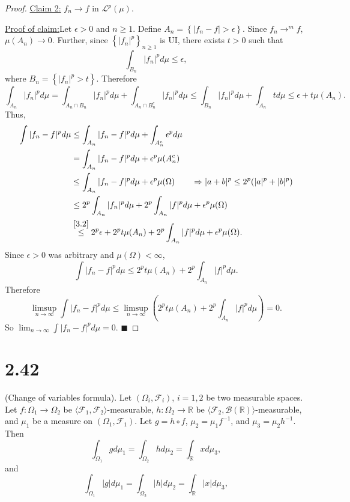 \documentclass[12pt]{article}
\newenvironment{claimproof}[1]{\par\noindent\underline{Proof of claim:}\space#1}{\hfill $\blacksquare$\vspace{3mm}}
\begin{document}
\begin{proof}
\underline{Claim 2:} $f_{n} \rightarrow f$ in $\mathcal{L}^{p}(\mu)$.
\begin{claimproof}
Let $\epsilon > 0$ and $n\geq 1$. Define $A_{n} = \left\{ |f_{n} - f| > \epsilon \right\}$. Since $f_{n} \rightarrow^{m} f$, $\mu(A_{n}) \rightarrow 0$. Further,
since $\left\{ |f_{n}|^{p} \right\}_{n\geq 1}$ is UI, there exists $t > 0$ such that 
\[ \int_{B_{n}}|f_{n}|^{p}d\mu \leq \epsilon, \]
where $B_{n} = \left\{ |f_{n}|^{p} > t \right\}$. Therefore 
\begin{equation}
\int_{A_{n}} |f_{n}|^{p}d\mu = \int_{A_{n}\cap B_{n}}|f_{n}|^{p}d\mu + \int_{A_{n}\cap B_{n}^{c}}|f_{n}|^{p}d\mu \leq \int_{B_{n}}|f_{n}|^{p}d\mu 
+ \int_{A_{n}}td\mu \leq \epsilon + t\mu(A_{n}).
\label{3.2}
\end{equation}
Thus,
\begin{align*}
\int |f_{n} - f|^{p} d\mu & \leq \int_{A_{n}}|f_{n} - f|^{p}d\mu + \int_{A_{n}^{c}}\epsilon^{p} d\mu \\
& = \int_{A_{n}}|f_{n}- f|^{p}d\mu + \epsilon^{p}\mu(A_{n}^{c}) \\
& \leq \int_{A_{n}}|f_{n} - f|^{p}d\mu + \epsilon^{p}\mu(\Omega) \qquad \Rightarrow |a+b|^{p} \leq 2^{p}(|a|^{p} + |b|^{p}) \\
& \leq 2^{p} \int_{A_{n}}|f_{n}|^{p}d\mu + 2^{p}\int_{A_{n}}|f|^{p}d\mu + \epsilon^{p}\mu(\Omega) \\
& \stackrel{\eqref{3.2}}{\leq} 2^{p}\epsilon + 2^{p}t\mu(A_{n}) + 2^{p}\int_{A_{n}}|f|^{p}d\mu + \epsilon^{p}\mu(\Omega).
\end{align*}
Since $\epsilon > 0$ was arbitrary and $\mu(\Omega) < \infty$,
\[ \int |f_{n} - f|^{p}d\mu \leq 2^{p}t\mu(A_{n}) + 2^{p}\int_{A_{n}}|f|^{p}d\mu. \]
Therefore 
\[ \limsup_{n\rightarrow\infty}\int |f_{n} - f|^{p}d\mu \leq \limsup_{n\rightarrow\infty}\left( 2^{p}t\mu(A_{n}) + 2^{p}\int_{A_{n}}|f|^{p}d\mu \right) = 0. \]
So $\lim_{n\rightarrow \infty}\int|f_{n} - f|^{p}d\mu = 0$.
\end{claimproof}

\end{proof}



\newpage 
\section*{2.42}
(Change of variables formula). Let $(\Omega_{i},\mathcal{F}_{i})$, $i = 1,2$ be two measurable spaces. Let $f : \Omega_{1} \rightarrow \Omega_{2}$ be
$\langle \mathcal{F}_{1},\mathcal{F}_{2}\rangle$-measurable, $h : \Omega_{2}\rightarrow \mathbb{R}$ be
$\langle\mathcal{F}_{2},\mathcal{B}(\mathbb{R})\rangle$-measurable, and $\mu_{1}$ be a measure on $(\Omega_{1}, \mathcal{F}_{1})$. Let $g = h\circ f$,
$\mu_{2} = \mu_{1}f^{-1}$, and $\mu_{3} = \mu_{2}h^{-1}$. Then 
\[ \int_{\Omega_{1}}gd\mu_{1} = \int_{\Omega_{2}}hd\mu_{2} = \int_{\mathbb{R}}xd\mu_{3}, \]
and 
\[ \int_{\Omega_{1}}|g|d\mu_{1} = \int_{\Omega_{2}}|h|d\mu_{2} = \int_{\mathbb{R}}|x|d\mu_{3}, \]
\end{document}
